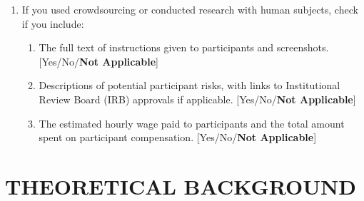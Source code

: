 \documentclass[twoside]{article}
\begin{document}
\begin{enumerate}
  \item If you used crowdsourcing or conducted research with human subjects, check if you include:
  \begin{enumerate}
    \item The full text of instructions given to participants and screenshots. [Yes/No/\textbf{Not Applicable}]
    \item Descriptions of potential participant risks, with links to Institutional Review Board (IRB) approvals if applicable. [Yes/No/\textbf{Not Applicable}]
    \item The estimated hourly wage paid to participants and the total amount spent on participant compensation. [Yes/No/\textbf{Not Applicable}]
  \end{enumerate}

\end{enumerate}

\clearpage
\onecolumn
\appendix





\section{THEORETICAL BACKGROUND}
\label{sec: basic_langevin_properties}


\end{document}
